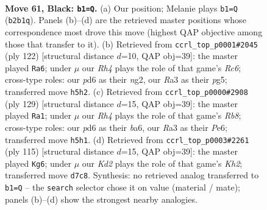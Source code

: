\documentclass[11pt]{article}
\begin{document}
\clearpage

\begin{figure}[p]\centering
\begin{subfigure}{0.46\textwidth}\centering
\resizebox{\linewidth}{!}{%
\newchessgame
\chessboard[
  setfen={8/3k4/3P4/1p1K2Br/8/r7/1p6/8 b - - 5 61},
  showmover=false,
  pgfstyle=straightmove, color=movearrow, markmove={b2-b1}
]}
\caption{}
\end{subfigure}\hfill
\begin{subfigure}{0.46\textwidth}\centering
\resizebox{\linewidth}{!}{%
\newchessgame
\chessboard[
  setfen={8/8/2R5/2b3p1/2k1K1P1/8/6n1/8 w - - 12 62},
  showmover=false,
  pgfstyle=straightmove, color=movearrow, markmove={c6-a6}
]}
\caption{}
\end{subfigure}
\\[4pt]
\begin{subfigure}{0.46\textwidth}\centering
\resizebox{\linewidth}{!}{%
\newchessgame
\chessboard[
  setfen={8/8/B3p3/8/5P2/2k1p3/8/1rNK4 b - - 0 65},
  showmover=false,
  pgfstyle=straightmove, color=movearrow, markmove={b1-a1}
]}
\caption{}
\end{subfigure}\hfill
\begin{subfigure}{0.46\textwidth}\centering
\resizebox{\linewidth}{!}{%
\newchessgame
\chessboard[
  setfen={8/7k/4r3/4B3/4K2p/7P/8/8 b - - 1 58},
  showmover=false,
  pgfstyle=straightmove, color=movearrow, markmove={h7-g6}
]}
\caption{}
\end{subfigure}
\caption{\textbf{Move 61, Black: \texttt{b1=Q}.} (a) Our position; Melanie plays \texttt{b1=Q} (\texttt{b2b1q}). Panels (b)--(d) are the retrieved master positions whose correspondence most drove this move (highest QAP objective among those that transfer to it). (b) Retrieved from \texttt{ccrl\_top\_p0001\#2045} (ply 122) [structural distance $d$=10, QAP obj=39]: the master played \texttt{Ra6}; under $\mu$ our \emph{Rh4} plays the role of that game's \emph{Rc6}; cross-type roles: our \emph{p}d6 as their \emph{n}g2, our \emph{R}a3 as their \emph{p}g5; transferred move \texttt{h5h2}. (c) Retrieved from \texttt{ccrl\_top\_p0000\#2908} (ply 129) [structural distance $d$=15, QAP obj=39]: the master played \texttt{Ra1}; under $\mu$ our \emph{Rh4} plays the role of that game's \emph{Rb8}; cross-type roles: our \emph{p}d6 as their \emph{b}a6, our \emph{R}a3 as their \emph{P}e6; transferred move \texttt{h5h1}. (d) Retrieved from \texttt{ccrl\_top\_p0003\#2261} (ply 115) [structural distance $d$=15, QAP obj=39]: the master played \texttt{Kg6}; under $\mu$ our \emph{Kd2} plays the role of that game's \emph{Kh2}; transferred move \texttt{d7c8}. Synthesis: no retrieved analog transferred to \texttt{b1=Q} -- the \texttt{search} selector chose it on value (material / mate); panels (b)--(d) show the strongest nearby analogies.}
\label{fig:thought-m121}
\end{figure}
\end{document}
